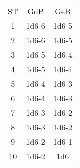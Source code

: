 \documentclass[a4paper]{article}
\begin{document}
\begin{table}[h]
 \centering
 {\renewcommand\arraystretch{1.25}
 \begin{tabular}{ l l l }
  \cline{1-1}\cline{2-2}\cline{3-3}  
    \multicolumn{1}{|c|}{ST \centering } &
    \multicolumn{1}{c|}{GdP \centering } &
    \multicolumn{1}{c|}{GeB \centering }
  \\  
  \cline{1-1}\cline{2-2}\cline{3-3}  
    \multicolumn{1}{|c|}{1 \centering } &
    \multicolumn{1}{c|}{1d6-6 \centering } &
    \multicolumn{1}{c|}{1d6-5 \centering }
  \\  
  \cline{1-1}\cline{2-2}\cline{3-3}  
    \multicolumn{1}{|c|}{2 \centering } &
    \multicolumn{1}{c|}{1d6-6 \centering } &
    \multicolumn{1}{c|}{1d6-5 \centering }
  \\  
  \cline{1-1}\cline{2-2}\cline{3-3}  
    \multicolumn{1}{|c|}{3 \centering } &
    \multicolumn{1}{c|}{1d6-5 \centering } &
    \multicolumn{1}{c|}{1d6-4 \centering }
  \\  
  \cline{1-1}\cline{2-2}\cline{3-3}  
    \multicolumn{1}{|c|}{4 \centering } &
    \multicolumn{1}{c|}{1d6-5 \centering } &
    \multicolumn{1}{c|}{1d6-4 \centering }
  \\  
  \cline{1-1}\cline{2-2}\cline{3-3}  
    \multicolumn{1}{|c|}{5 \centering } &
    \multicolumn{1}{c|}{1d6-4 \centering } &
    \multicolumn{1}{c|}{1d6-3 \centering }
  \\  
  \cline{1-1}\cline{2-2}\cline{3-3}  
    \multicolumn{1}{|c|}{6 \centering } &
    \multicolumn{1}{c|}{1d6-4 \centering } &
    \multicolumn{1}{c|}{1d6-3 \centering }
  \\  
  \cline{1-1}\cline{2-2}\cline{3-3}  
    \multicolumn{1}{|c|}{7 \centering } &
    \multicolumn{1}{c|}{1d6-3 \centering } &
    \multicolumn{1}{c|}{1d6-2 \centering }
  \\  
  \cline{1-1}\cline{2-2}\cline{3-3}  
    \multicolumn{1}{|c|}{8 \centering } &
    \multicolumn{1}{c|}{1d6-3 \centering } &
    \multicolumn{1}{c|}{1d6-2 \centering }
  \\  
  \cline{1-1}\cline{2-2}\cline{3-3}  
    \multicolumn{1}{|c|}{9 \centering } &
    \multicolumn{1}{c|}{1d6-2 \centering } &
    \multicolumn{1}{c|}{1d6-1 \centering }
  \\  
  \cline{1-1}\cline{2-2}\cline{3-3}  
    \multicolumn{1}{|c|}{10 \centering } &
    \multicolumn{1}{c|}{1d6-2 \centering } &
    \multicolumn{1}{c|}{1d6 \centering }
  \\  
  \cline{1-1}\cline{2-2}\cline{3-3}  

\end{tabular}}
\end{table}
\end{document}
